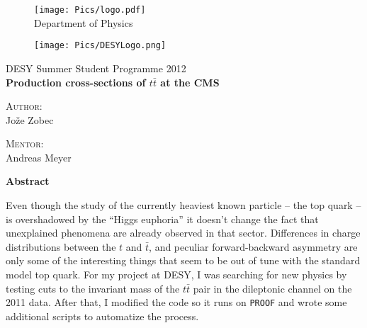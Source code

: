 \documentclass[a4paper, 12 pt, titlepage, twocolumn]{article}
\renewenvironment{abstract}[1][1.0]
{
	\begin{center}
		{\bf Abstract}\\[12pt]
		\begin{minipage}{#1\textwidth}
}
{
		\end{minipage}
	\end{center}
}
\newcommand{\ttbar}{
	\ensuremath{t\bar{t}}
}
\newcommand{\tbar}{
	\ensuremath{\bar{t}}
}
\begin{document}
\begin{titlepage}
	\begin{figure}[H]
		\centering
		\texttt{[image: Pics/logo.pdf]}\\[12pt]
		{\sc Department of Physics}
	\end{figure}
	\begin{figure}[H]\centering
		\texttt{[image: Pics/DESYLogo.png]}
	\end{figure}
	\begin{center}
		\large{{\sc DESY} Summer Student Programme 2012}\\[0.5cm]
		\LARGE\textbf{Production cross-sections of $\ttbar$ at the CMS}\\[1.0cm]

		\vspace{0.0cm}

		\begin{minipage}{0.4\textwidth}\small
			\begin{flushleft}
			\textsc{Author:}\\[0.2cm]
			Jože Zobec
			\end{flushleft}
		\end{minipage}
		\begin{minipage}{0.4\textwidth}\small
			\begin{flushright}
				\textsc{Mentor:}\\[0.2cm]
				Andreas Meyer
			\end{flushright}
		\end{minipage}
	\end{center}

	\vspace{3.0cm}

	\begin{abstract}
		Even though the study of the currently heaviest known particle -- the top quark -- is overshadowed by the ``Higgs
		euphoria'' it doesn't change the fact that unexplained phenomena are already observed in that
		sector. Differences in charge distributions between the $t$ and $\tbar$, and peculiar
		forward-backward
		asymmetry are only some of the interesting things that seem to be out of tune with the
		standard model top quark. For my project at DESY, I was searching for new physics by
		testing cuts to the invariant mass of the $\ttbar$ pair in the dileptonic channel on the
		2011 data. After that,
		I modified the code so it runs on {\tt PROOF} and wrote some additional scripts to automatize
		the process.
	\end{abstract}
	
	\vfill

\end{titlepage}
\end{document}
